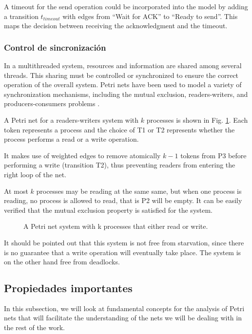 A timeout for the send operation could be incorporated into the model
by adding a transition $t_{timeout}$ with edges from ``Wait for ACK'' to ``Ready to send''.
This maps the decision between receiving the acknowledgment and the timeout.

\subsubsection{Control de sincronización}

In a multithreaded system, resources and information are shared among several threads.
This sharing must be controlled or synchronized
to ensure the correct operation of the overall system.
Petri nets have been used to model a variety of synchronization mechanisms,
including the mutual exclusion, readers-writers, and producers-consumers problems \cite{murata1989}.

A Petri net for a readers-writers system with $k$ processes
is shown in Fig. \ref{fig:readers-writers-example}.
Each token represents a process and the choice of T1 or T2
represents whether the process performs a read or a write operation.

It makes use of weighted edges to remove atomically
$k - 1$ tokens from P3 before performing a write (transition T2),
thus preventing readers from entering the right loop of the net.

At most $k$ processes may be reading at the same same,
but when one process is reading, no process is allowed to read, that is P2 will be empty.
It can be easily verified that the mutual exclusion property is satisfied for the system.

\begin{figure}[!htbp]
      \centering
      
      \caption{A Petri net system with k processes that either read or write.}
      \label{fig:readers-writers-example}
\end{figure}

It should be pointed out that this system is not free from starvation,
since there is no guarantee that a write operation will eventually take place.
The system is on the other hand free from deadlocks.

\subsection{Propiedades importantes}

In this subsection, we will look at fundamental concepts for the analysis of Petri nets
that will facilitate the understanding of the nets we will be dealing with in the rest of the work.

